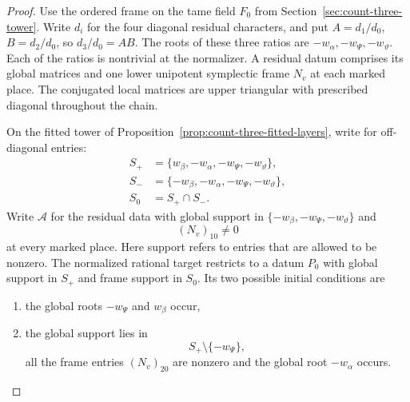 \begin{proof}
Use the ordered frame on the tame field \(F_0\) from
Section~\ref{sec:count-three-tower}. Write \(d_i\) for
the four diagonal residual characters, and put
\(A=d_1/d_0\), \(B=d_2/d_0\), so \(d_3/d_0=AB\).
The roots of these three ratios are
\(-w_\alpha,-w_\Psi,-w_\vartheta\). Each of the
ratios is nontrivial at the normalizer. A residual
datum comprises its global matrices and one lower
unipotent symplectic frame \(N_v\) at each marked
place. The conjugated local matrices are upper
triangular with prescribed diagonal throughout
the chain.

\begin{established}\label{hyp:count-three-path-endpoints}
On the fitted tower of Proposition~\ref{prop:count-three-fitted-layers}, write for off-diagonal entries:
\[
 \begin{split}
 S_+&=\{w_\beta,-w_\alpha,-w_\Psi,-w_\vartheta\},\\
 S_-&=\{-w_\beta,-w_\alpha,-w_\Psi,-w_\vartheta\},\\
 S_0&=S_+\cap S_- .
 \end{split}
\]
Write \(\mathcal A\) for the residual data with
global support in
\(\{-w_\beta,-w_\Psi,-w_\vartheta\}\) and
\[
 (N_v)_{10}\ne0
\]
at every marked place.
Here support refers to entries that are allowed to
be nonzero. The normalized rational target restricts
to a datum \(P_0\) with global support in \(S_+\) and frame support in
\(S_0\). Its two possible initial conditions are
\begin{enumerate}
\item the global roots \(-w_\Psi\) and \(w_\beta\) occur,
\item the global support lies in
\[
 S_+\setminus\{-w_\Psi\},
\]
all the frame
entries \((N_v)_{20}\) are nonzero and
the global root \(-w_\alpha\) occurs.
\end{enumerate}



\end{established}
\end{proof}
